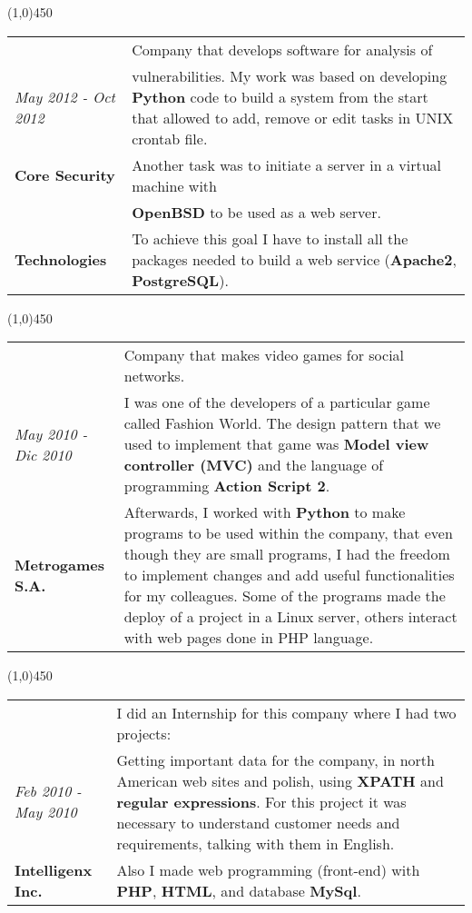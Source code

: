 \begin{center}
\line(1,0){450}
\end{center}

\begin{tabular}{C{4.5cm}|p{11cm}}
& \large Company that develops software for analysis of \\
\large\textit{May 2012 - Oct 2012} &  \large vulnerabilities. My work was based on developing \textbf{Python} code to build a system from the start that allowed to add, remove or edit tasks in UNIX crontab file. \\
\large\textbf{Core Security} & \large Another task was to initiate a server in a virtual machine with \\
& \large\textbf{OpenBSD} to be used as a web server. \\
 \large\textbf{Technologies}& \large To achieve this goal I have to install all the packages needed to build a web service (\textbf{Apache2}, \textbf{PostgreSQL}). \\
\end{tabular}

\begin{center}
\line(1,0){450}
\end{center}
\noindent

\begin{tabular}{C{4.5cm}|p{11cm}}
& \large Company that makes video games for social networks. \\
\large\textit{May 2010 - Dic 2010} &  \large I was one of the developers of a particular game called Fashion World. The design pattern that we used to implement that game was \textbf{Model view controller (MVC)} and the language of programming \textbf{Action Script 2}.\\
\large\textbf{Metrogames S.A.} & \large Afterwards, I worked with \textbf{Python} to make programs to be used within the company, that even though they are small programs, I had the freedom to implement changes and add useful functionalities for my colleagues. Some of the programs made the deploy of a project in a Linux server, others interact with web pages done in PHP language.
\end{tabular}

\begin{center}
\line(1,0){450}
\end{center}
\noindent
\begin{tabular}{C{5cm}|p{11cm}}
& \large I did an Internship for this company where I had two projects:\\
\large\textit{Feb 2010 - May 2010} & \large Getting important data for the company, in north American web sites and polish, using \textbf{XPATH} and \textbf{regular expressions}.  For this project it was necessary to understand customer needs and requirements, talking with them in English.\\
\large\textbf{Intelligenx Inc.} & \large Also I made web programming (front-end) with \textbf{PHP}, \textbf{HTML}, and database \textbf{MySql}.
\end{tabular}

